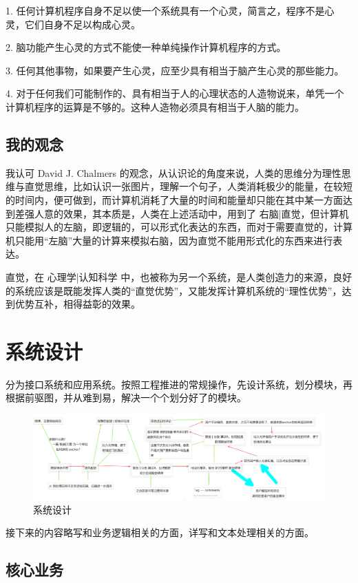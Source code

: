 \documentclass[UTF8]{ctexart}
\begin{document}
1. 任何计算机程序自身不足以使一个系统具有一个心灵，简言之，程序不是心灵，它们自身不足以构成心灵。

2. 脑功能产生心灵的方式不能使一种单纯操作计算机程序的方式。

3. 任何其他事物，如果要产生心灵，应至少具有相当于脑产生心灵的那些能力。

4. 对于任何我们可能制作的、具有相当于人的心理状态的人造物说来，单凭一个计算机程序的运算是不够的。这种人造物必须具有相当于人脑的能力。
\cite{jsbook2002}

\subsection{我的观念}
我认可 David J. Chalmers 的观念，从认识论的角度来说，人类的思维分为理性思维与直觉思维，比如认识一张图片，理解一个句子，人类消耗极少的能量，在较短的时间内，便可做到，而计算机消耗了大量的时间和能量却只能在其中某一方面达到差强人意的效果，其本质是，人类在上述活动中，用到了 右脑|直觉，但计算机只能模拟人的左脑，即逻辑的，可以形式化表达的东西，而对于需要直觉的，计算机只能用“左脑”大量的计算来模拟右脑，因为直觉不能用形式化的东西来进行表达。

直觉，在 心理学|认知科学 中，也被称为另一个系统，是人类创造力的来源，良好的系统应该是既能发挥人类的“直觉优势”，又能发挥计算机系统的“理性优势”，达到优势互补，相得益彰的效果。

\section{系统设计}
分为接口系统和应用系统。按照工程推进的常规操作，先设计系统，划分模块，再根据前驱图，并从难到易，解决一个个划分好了的模块。

\begin{figure}[ht]
\centering
\includegraphics[scale=0.4]{art1.png}
\caption{系统设计}
\end{figure}

接下来的内容略写和业务逻辑相关的方面，详写和文本处理相关的方面。

\subsection{核心业务}
\end{document}
